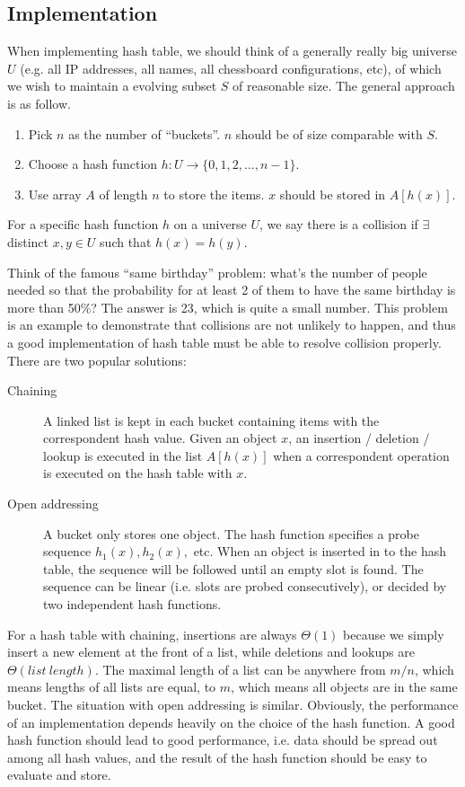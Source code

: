 \subsection{Implementation}
When implementing hash table, we should think of a generally really big universe $U$ (e.g. all IP addresses, all names, all chessboard configurations, etc), of which we wish to maintain a evolving subset $S$ of reasonable size. The general approach is as follow.
\begin{enumerate}
\item Pick $n$ as the number of ``buckets''. $n$ should be of size comparable with $S$.
\item Choose a hash function $h:U\rightarrow\{0,1,2,\dots,n-1\}$.
\item Use array $A$ of length $n$ to store the items. $x$ should be stored in $A[h(x)]$.
\end{enumerate}
\begin{definition}
For a specific hash function $h$ on a universe $U$, we say there is a collision if $\exists$ distinct $x,y\in U$ such that $h(x)=h(y)$.
\end{definition}
Think of the famous ``same birthday'' problem: what's the number of people needed so that the probability for at least 2 of them to have the same birthday is more than 50\%? The answer is 23, which is quite a small number. This problem is an example to demonstrate that collisions are not unlikely to happen, and thus a good implementation of hash table must be able to resolve collision properly. There are two popular solutions:
\begin{description}
\item[Chaining]A linked list is kept in each bucket containing items with the correspondent hash value. Given an object $x$, an insertion / deletion / lookup is executed in the list $A[h(x)]$ when a correspondent operation is executed on the hash table with $x$.
\item[Open addressing]A bucket only stores one object. The hash function specifies a probe sequence $h_1(x),h_2(x),$ etc. When an object is inserted in to the hash table, the sequence will be followed until an empty slot is found. The sequence can be linear (i.e. slots are probed consecutively), or decided by two independent hash functions.
\end{description}

For a hash table with chaining, insertions are always $\Theta(1)$ because we simply insert a new element at the front of a list, while deletions and lookups are $\Theta(list\:length)$. The maximal length of a list can be anywhere from $m/n$, which means lengths of all lists are equal, to $m$, which means all objects are in the same bucket. The situation with open addressing is similar. Obviously, the performance of an implementation depends heavily on the choice of the hash function. A good hash function should lead to good performance, i.e. data should be spread out among all hash values, and the result of the hash function should be easy to evaluate and store.


